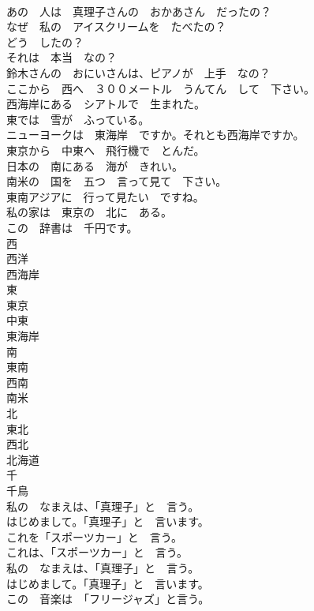 \documentclass[8pt]{extreport}
\begin{document}
\begin{CJK}{UTF8}{min}
\\	あの　人は　真理子さんの　おかあさん　だったの？	
\\	なぜ　私の　アイスクリームを　たべたの？	
\\	どう　したの？	
\\	それは　本当　なの？	
\\	鈴木さんの　おにいさんは、ピアノが　上手　なの？	
\\	ここから　西へ　３００メートル　うんてん　して　下さい。	
\\	西海岸にある　シアトルで　生まれた。	
\\	東では　雪が　ふっている。	
\\	ニューヨークは　東海岸　ですか。それとも西海岸ですか。	
\\	東京から　中東へ　飛行機で　とんだ。	
\\	日本の　南にある　海が　きれい。	
\\	南米の　国を　五つ　言って見て　下さい。	
\\	東南アジアに　行って見たい　ですね。	
\\	私の家は　東京の　北に　ある。	
\\	この　辞書は　千円です。	
\\	西	
\\	西洋	
\\	西海岸	
\\	東	
\\	東京	
\\	中東	
\\	東海岸	
\\	南	
\\	東南	
\\	西南	
\\	南米	
\\	北	
\\	東北	
\\	西北	
\\	北海道	
\\	千	
\\	千鳥	
\\	私の　なまえは、「真理子」と　言う。	
\\	はじめまして。「真理子」と　言います。	
\\	これを「スポーツカー」と　言う。	
\\	これは、「スポーツカー」と　言う。	
\\	私の　なまえは、「真理子」と　言う。	
\\	はじめまして。「真理子」と　言います。	
\\	この　音楽は　「フリージャズ」と言う。	

\end{CJK}
\end{document}

